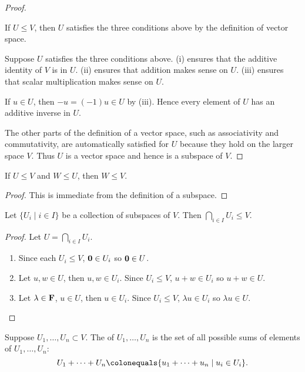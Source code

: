 \begin{proof} \

\fbox{$\implies$} If $U\le V$, then $U$ satisfies the three conditions above by the definition of vector space.

\fbox{$\impliedby$} Suppose $U$ satisfies the three conditions above. (i) ensures that the additive identity of $V$ is in $U$. (ii) ensures that addition makes sense on $U$. (iii) ensures that scalar multiplication makes sense on $U$.

If $u\in U$, then $-u=(-1)u\in U$ by (iii). Hence every element of $U$ has an additive inverse in $U$.

The other parts of the definition of a vector space, such as associativity and commutativity, are automatically satisfied for $U$ because they hold on the larger space $V$. Thus $U$ is a vector space and hence is a subspace of $V$.
\end{proof}

\begin{lemma}
If $U\le V$ and $W\le U$, then $W\le V$.
\end{lemma}

\begin{proof}
This is immediate from the definition of a subspace.
\end{proof}

\begin{lemma}
Let $\{U_i\mid i\in I\}$ be a collection of subspaces of $V$. Then $\bigcap_{i\in I}U_i\le V$.
\end{lemma}

\begin{proof}
Let $U=\bigcap_{i\in I}U_i$. 
\begin{enumerate}[label=(\roman*)]
\item Since each $U_i\le V$, $\vb{0}\in U_i$ so $\vb{0}\in U$.
\item Let $u,w\in U$, then $u,w\in U_i$. Since $U_i\le V$, $u+w\in U_i$ so $u+w\in U$.
\item Let $\lambda\in\mathbf F$, $u\in U$, then $u\in U_i$. Since $U_i\le V$, $\lambda u\in U_i$ so $\lambda u\in U$.
\end{enumerate}
\end{proof}

\begin{definition}
Suppose $U_1,\dots,U_n\subset V$. The  of $U_1,\dots,U_n$ is the set of all possible sums of elements of $U_1,\dots,U_n$:
\[U_1+\cdots+U_n\colonequals\{u_1+\cdots+u_n\mid u_i\in U_i\}.\]
\end{definition}

